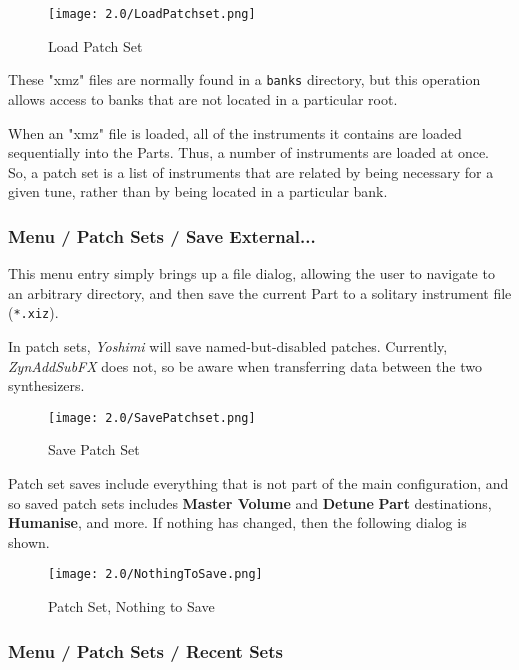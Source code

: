 \begin{figure}[H]
   \centering
   \texttt{[image: 2.0/LoadPatchset.png]}
   \caption{Load Patch Set}
   \label{fig:yoshimi_menu_open_parameters}
\end{figure}

   These "xmz" files are normally found in a \texttt{banks} directory, but this
   operation allows access to banks that are not located in a particular root.

   When an "xmz" file is loaded, all of the instruments it contains are
   loaded sequentially into the Parts.  Thus, a number of instruments are loaded
   at once.  So, a patch set is a list of instruments that are related by
   being necessary for a given tune, rather than by being located in a
   particular bank.

\subsubsection{Menu / Patch Sets / Save External...}
\label{subsubsec:menu_patch_sets_save}

   This menu entry simply brings up a file dialog, allowing the user to
   navigate to an arbitrary directory, and then save the current Part
   to a solitary instrument file (\texttt{*.xiz}).

   In patch sets, \textsl{Yoshimi} will save named-but-disabled patches.
   Currently, \textsl{ZynAddSubFX} does not, so be aware when transferring
   data between the two synthesizers.

\begin{figure}[H]
   \centering
   \texttt{[image: 2.0/SavePatchset.png]}
   \caption{Save Patch Set}
   \label{fig:yoshimi_menu_save_parameters}
\end{figure}

   Patch set saves include everything that is not part of the main
   configuration, and so saved patch sets
   includes \textbf{Master Volume} and \textbf{Detune}
   \textbf{Part} destinations, \textbf{Humanise},
   and more.
   If nothing has changed, then the following dialog is shown.

\begin{figure}[H]
   \centering
   \texttt{[image: 2.0/NothingToSave.png]}
   \caption{Patch Set, Nothing to Save}
   \label{fig:yoshimi_menu_nothing_to_save_parameters}
\end{figure}

\subsubsection{Menu / Patch Sets / Recent Sets}
\label{subsubsec:menu_patch_sets_recent_sets}

